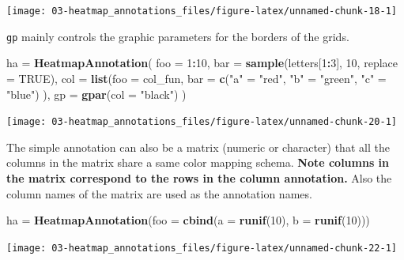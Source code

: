 \documentclass[]{book}
\newenvironment{Shaded}{\begin{snugshade}}{\end{snugshade}}
\newcommand{\KeywordTok}[1]{\textcolor[rgb]{0.13,0.29,0.53}{\textbf{#1}}}
\newcommand{\DataTypeTok}[1]{\textcolor[rgb]{0.13,0.29,0.53}{#1}}
\newcommand{\DecValTok}[1]{\textcolor[rgb]{0.00,0.00,0.81}{#1}}
\newcommand{\StringTok}[1]{\textcolor[rgb]{0.31,0.60,0.02}{#1}}
\newcommand{\OtherTok}[1]{\textcolor[rgb]{0.56,0.35,0.01}{#1}}
\newcommand{\OperatorTok}[1]{\textcolor[rgb]{0.81,0.36,0.00}{\textbf{#1}}}
\newcommand{\NormalTok}[1]{#1}
\theoremstyle{definition}
\theoremstyle{definition}
\theoremstyle{definition}
\theoremstyle{remark}
\begin{document}
\begin{center}\texttt{[image: 03-heatmap\_annotations\_files/figure-latex/unnamed-chunk-18-1]} \end{center}

\texttt{gp} mainly controls the graphic parameters for the borders of
the grids.

\begin{Shaded}
\begin{Highlighting}[]
\NormalTok{ha =}\StringTok{ }\KeywordTok{HeatmapAnnotation}\NormalTok{(}
    \DataTypeTok{foo =} \DecValTok{1}\OperatorTok{:}\DecValTok{10}\NormalTok{, }
    \DataTypeTok{bar =} \KeywordTok{sample}\NormalTok{(letters[}\DecValTok{1}\OperatorTok{:}\DecValTok{3}\NormalTok{], }\DecValTok{10}\NormalTok{, }\DataTypeTok{replace =} \OtherTok{TRUE}\NormalTok{),}
    \DataTypeTok{col =} \KeywordTok{list}\NormalTok{(}\DataTypeTok{foo =}\NormalTok{ col_fun,}
               \DataTypeTok{bar =} \KeywordTok{c}\NormalTok{(}\StringTok{"a"}\NormalTok{ =}\StringTok{ "red"}\NormalTok{, }\StringTok{"b"}\NormalTok{ =}\StringTok{ "green"}\NormalTok{, }\StringTok{"c"}\NormalTok{ =}\StringTok{ "blue"}\NormalTok{)}
\NormalTok{    ),}
    \DataTypeTok{gp =} \KeywordTok{gpar}\NormalTok{(}\DataTypeTok{col =} \StringTok{"black"}\NormalTok{)}
\NormalTok{)}
\end{Highlighting}
\end{Shaded}

\begin{center}\texttt{[image: 03-heatmap\_annotations\_files/figure-latex/unnamed-chunk-20-1]} \end{center}

The simple annotation can also be a matrix (numeric or character) that
all the columns in the matrix share a same color mapping schema.
\textbf{Note columns in the matrix correspond to the rows in the column
annotation.} Also the column names of the matrix are used as the
annotation names.

\begin{Shaded}
\begin{Highlighting}[]
\NormalTok{ha =}\StringTok{ }\KeywordTok{HeatmapAnnotation}\NormalTok{(}\DataTypeTok{foo =} \KeywordTok{cbind}\NormalTok{(}\DataTypeTok{a =} \KeywordTok{runif}\NormalTok{(}\DecValTok{10}\NormalTok{), }\DataTypeTok{b =} \KeywordTok{runif}\NormalTok{(}\DecValTok{10}\NormalTok{)))}
\end{Highlighting}
\end{Shaded}

\begin{center}\texttt{[image: 03-heatmap\_annotations\_files/figure-latex/unnamed-chunk-22-1]} \end{center}
\end{document}
